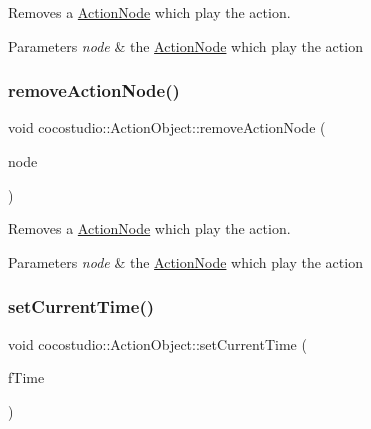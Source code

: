 Removes a \hyperlink{classcocostudio_1_1ActionNode}{Action\+Node} which play the action.


\begin{DoxyParams}{Parameters}
{\em node} & the \hyperlink{classcocostudio_1_1ActionNode}{Action\+Node} which play the action \\
\hline
\end{DoxyParams}
\mbox{\label{classcocostudio_1_1ActionObject_a2923d174d80fb1a62749b32fdeb9b056}} 
\subsubsection{\texorpdfstring{remove\+Action\+Node()}{removeActionNode()}\hspace{0.1cm}{\footnotesize\ttfamily [2/2]}}
{\footnotesize\ttfamily void cocostudio\+::\+Action\+Object\+::remove\+Action\+Node (\begin{DoxyParamCaption}\item[{\hyperlink{classcocostudio_1_1ActionNode}{Action\+Node} $\ast$}]{node }\end{DoxyParamCaption})}

Removes a \hyperlink{classcocostudio_1_1ActionNode}{Action\+Node} which play the action.


\begin{DoxyParams}{Parameters}
{\em node} & the \hyperlink{classcocostudio_1_1ActionNode}{Action\+Node} which play the action \\
\hline
\end{DoxyParams}
\mbox{\label{classcocostudio_1_1ActionObject_a031f6e35417d37f74d303c816284c11f}} 
\subsubsection{\texorpdfstring{set\+Current\+Time()}{setCurrentTime()}\hspace{0.1cm}{\footnotesize\ttfamily [1/2]}}
{\footnotesize\ttfamily void cocostudio\+::\+Action\+Object\+::set\+Current\+Time (\begin{DoxyParamCaption}\item[{float}]{f\+Time }\end{DoxyParamCaption})}

